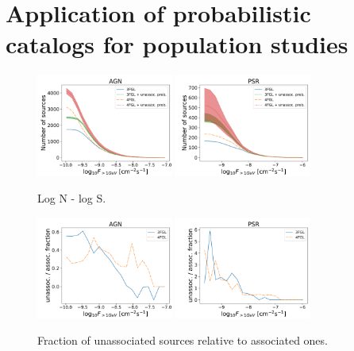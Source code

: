 \section{Application of probabilistic catalogs for population studies}



\begin{figure}[h]
\includegraphics[width=0.4\textwidth]{plots/logN_logS_AGN.pdf}
\includegraphics[width=0.4\textwidth]{plots/logN_logS_PSR.pdf}
\caption{Log N - log S.}  
\label{fig:logN_logS}
\end{figure}




\begin{figure}[h]
\includegraphics[width=0.4\textwidth]{plots/logN_logS_diff_AGN.pdf}
\includegraphics[width=0.4\textwidth]{plots/logN_logS_diff_PSR.pdf}
\caption{Fraction of unassociated sources relative to associated ones.}  
\label{fig:unass_vs_ass_frac}
\end{figure}



